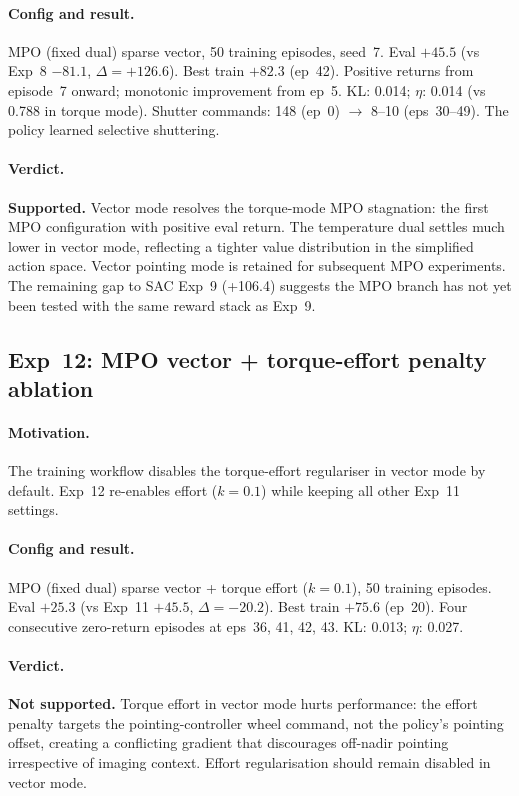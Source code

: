 \paragraph{Config and result.}
MPO (fixed dual) sparse vector, 50 training episodes, seed~7.
Eval $+45.5$ (vs Exp~8 $-81.1$, $\Delta=+126.6$).
Best train $+82.3$ (ep~42).
Positive returns from episode~7 onward; monotonic improvement from ep~5.
KL: 0.014; $\eta$: 0.014 (vs 0.788 in torque mode).
Shutter commands: 148 (ep~0) $\to$ 8--10 (eps~30--49).
The policy learned selective shuttering.

\paragraph{Verdict.}
\textbf{Supported.}
Vector mode resolves the torque-mode MPO stagnation: the first MPO configuration with positive eval return.
The temperature dual settles much lower in vector mode, reflecting a tighter value distribution in the simplified action space.
Vector pointing mode is retained for subsequent MPO experiments.
The remaining gap to SAC Exp~9 (+106.4) suggests the MPO branch has not yet been tested with the same reward stack as Exp~9.

\subsection{Exp~12: MPO vector + torque-effort penalty ablation}
\label{sec:exp12}

\paragraph{Motivation.}
The training workflow disables the torque-effort regulariser in vector mode by default.
Exp~12 re-enables effort ($k=0.1$) while keeping all other Exp~11 settings.

\paragraph{Config and result.}
MPO (fixed dual) sparse vector + torque effort ($k=0.1$), 50 training episodes.
Eval $+25.3$ (vs Exp~11 $+45.5$, $\Delta=-20.2$).
Best train $+75.6$ (ep~20).
Four consecutive zero-return episodes at eps~36, 41, 42, 43.
KL: 0.013; $\eta$: 0.027.

\paragraph{Verdict.}
\textbf{Not supported.}
Torque effort in vector mode hurts performance: the effort penalty targets the pointing-controller wheel command,
not the policy's pointing offset, creating a conflicting gradient that discourages off-nadir pointing
irrespective of imaging context.
Effort regularisation should remain disabled in vector mode.

